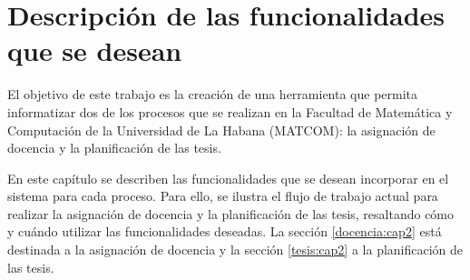 \chapter{Descripción de las funcionalidades que se desean}\label{chapter:features}
El objetivo de este trabajo es la creación de una herramienta
que permita informatizar dos de los procesos que se realizan en la Facultad de Matemática y
Computación de la Universidad de La Habana (MATCOM): la asignación de docencia y la planificación de las tesis. 

En este capítulo se describen las funcionalidades que se desean incorporar
en el sistema para cada proceso. 
Para ello, se ilustra el flujo de trabajo actual para 
realizar la asignación de docencia y la planificación de las tesis, resaltando 
cómo y cuándo utilizar las funcionalidades deseadas.
La sección \ref{docencia:cap2} está destinada a la asignación de docencia y 
la sección \ref{tesis:cap2} a la planificación de las tesis.












